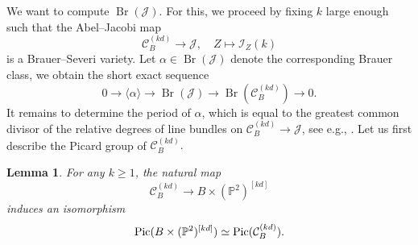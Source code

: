 \documentclass[11pt]{amsart}
\theoremstyle{plain}
\newtheorem{lem}[thm]{Lemma}
\theoremstyle{definition}
\theoremstyle{remark}
\DeclareMathOperator{\Br}{Br}
\newcommand{\Pic}{\mathop{\rm Pic}\nolimits}
\begin{document}
We want to compute $\Br(\mathcal J)$. For this, we proceed by fixing $k$ large enough such that the Abel--Jacobi map
\[
\mathcal C^{(kd)}_B \to\mathcal J,\quad 
Z \mapsto \mathcal I_Z(k)
\]
is a Brauer--Severi variety. Let $\alpha \in \Br(\mathcal J)$ denote the corresponding Brauer class, we obtain the short exact sequence 
\begin{equation*}
    0 \to \langle \alpha \rangle \to \Br(\mathcal J) \to \Br(\mathcal C^{(kd)}_{B}) \to 0.
\end{equation*}
It remains to determine the period of $\alpha$, which is equal to the greatest common divisor of the relative degrees of line bundles on $\mathcal C^{(kd)}_B \to \mathcal J$, see e.g., \cite[Lemma~1.1]{Gounelas-Huybrechts}. Let us first describe the Picard group of $\mathcal C_B^{(kd)}.$
\begin{lem}\label{lem: desc pic}
    For any $k \geq 1$, the natural map
    $$\mathcal C^{(kd)}_B \to B \times (\mathbb P^2)^{[kd]}$$
    induces an isomorphism
    $$\Pic(B \times (\mathbb P^2)^{[kd]}) \simeq \Pic(\mathcal C^{(kd)}_B).$$ 
\end{lem}
\end{document}
